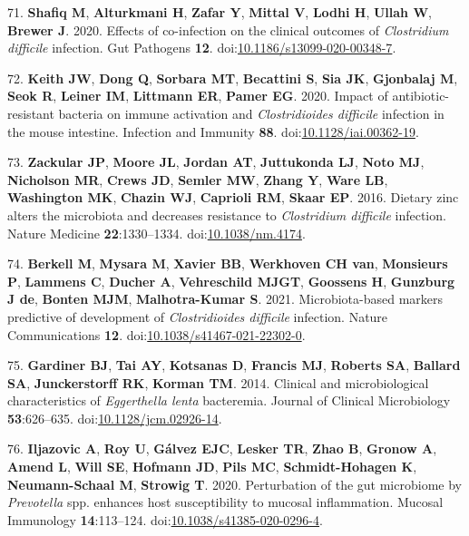\documentclass[
  12pt,
]{article}
\newenvironment{cslreferences}%
  {}%
  {\par}
\begin{document}
\begin{cslreferences}
\leavevmode\hypertarget{ref-Shafiq2020}{}%
71. \textbf{Shafiq M}, \textbf{Alturkmani H}, \textbf{Zafar Y},
\textbf{Mittal V}, \textbf{Lodhi H}, \textbf{Ullah W}, \textbf{Brewer
J}. 2020. Effects of co-infection on the clinical outcomes of
\emph{Clostridium difficile} infection. Gut Pathogens \textbf{12}.
doi:\href{https://doi.org/10.1186/s13099-020-00348-7}{10.1186/s13099-020-00348-7}.

\leavevmode\hypertarget{ref-Keith2020}{}%
72. \textbf{Keith JW}, \textbf{Dong Q}, \textbf{Sorbara MT},
\textbf{Becattini S}, \textbf{Sia JK}, \textbf{Gjonbalaj M},
\textbf{Seok R}, \textbf{Leiner IM}, \textbf{Littmann ER}, \textbf{Pamer
EG}. 2020. Impact of antibiotic-resistant bacteria on immune activation
and \emph{Clostridioides difficile} infection in the mouse intestine.
Infection and Immunity \textbf{88}.
doi:\href{https://doi.org/10.1128/iai.00362-19}{10.1128/iai.00362-19}.

\leavevmode\hypertarget{ref-Zackular2016}{}%
73. \textbf{Zackular JP}, \textbf{Moore JL}, \textbf{Jordan AT},
\textbf{Juttukonda LJ}, \textbf{Noto MJ}, \textbf{Nicholson MR},
\textbf{Crews JD}, \textbf{Semler MW}, \textbf{Zhang Y}, \textbf{Ware
LB}, \textbf{Washington MK}, \textbf{Chazin WJ}, \textbf{Caprioli RM},
\textbf{Skaar EP}. 2016. Dietary zinc alters the microbiota and
decreases resistance to \emph{Clostridium difficile} infection. Nature
Medicine \textbf{22}:1330--1334.
doi:\href{https://doi.org/10.1038/nm.4174}{10.1038/nm.4174}.

\leavevmode\hypertarget{ref-Berkell2021}{}%
74. \textbf{Berkell M}, \textbf{Mysara M}, \textbf{Xavier BB},
\textbf{Werkhoven CH van}, \textbf{Monsieurs P}, \textbf{Lammens C},
\textbf{Ducher A}, \textbf{Vehreschild MJGT}, \textbf{Goossens H},
\textbf{Gunzburg J de}, \textbf{Bonten MJM}, \textbf{Malhotra-Kumar S}.
2021. Microbiota-based markers predictive of development of
\emph{Clostridioides difficile} infection. Nature Communications
\textbf{12}.
doi:\href{https://doi.org/10.1038/s41467-021-22302-0}{10.1038/s41467-021-22302-0}.

\leavevmode\hypertarget{ref-Gardiner2014}{}%
75. \textbf{Gardiner BJ}, \textbf{Tai AY}, \textbf{Kotsanas D},
\textbf{Francis MJ}, \textbf{Roberts SA}, \textbf{Ballard SA},
\textbf{Junckerstorff RK}, \textbf{Korman TM}. 2014. Clinical and
microbiological characteristics of \emph{Eggerthella lenta} bacteremia.
Journal of Clinical Microbiology \textbf{53}:626--635.
doi:\href{https://doi.org/10.1128/jcm.02926-14}{10.1128/jcm.02926-14}.

\leavevmode\hypertarget{ref-Iljazovic2020}{}%
76. \textbf{Iljazovic A}, \textbf{Roy U}, \textbf{Gálvez EJC},
\textbf{Lesker TR}, \textbf{Zhao B}, \textbf{Gronow A}, \textbf{Amend
L}, \textbf{Will SE}, \textbf{Hofmann JD}, \textbf{Pils MC},
\textbf{Schmidt-Hohagen K}, \textbf{Neumann-Schaal M}, \textbf{Strowig
T}. 2020. Perturbation of the gut microbiome by \emph{Prevotella} spp.
enhances host susceptibility to mucosal inflammation. Mucosal Immunology
\textbf{14}:113--124.
doi:\href{https://doi.org/10.1038/s41385-020-0296-4}{10.1038/s41385-020-0296-4}.


\end{cslreferences}
\end{document}
